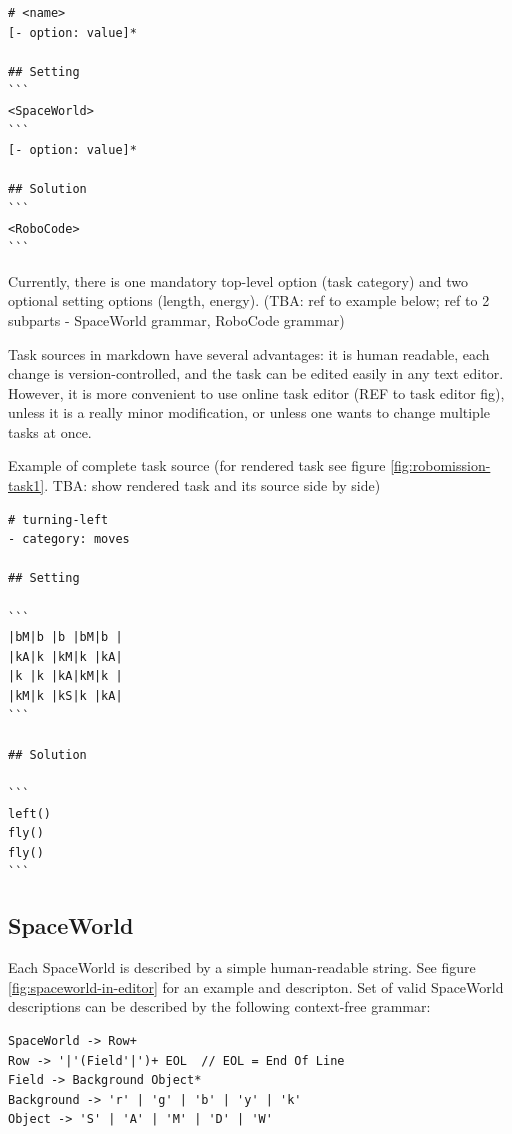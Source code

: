 \begin{lstlisting}
# <name>
[- option: value]*

## Setting
```
<SpaceWorld>
```
[- option: value]*

## Solution
```
<RoboCode>
```
\end{lstlisting}

Currently, there is one mandatory top-level option (task category)
and two optional setting options (length, energy).
(TBA: ref to example below; ref to 2 subparts - SpaceWorld grammar, RoboCode grammar)

Task sources in markdown have several advantages:
it is human readable,
each change is version-controlled,
and the task can be edited easily in any text editor.
However, it is more convenient to use online task editor (REF to task editor fig),
unless it is a really minor modification, or unless one wants to change multiple tasks at once.



Example of complete task source (for rendered task see figure \ref{fig:robomission-task1}. TBA: show rendered task and its source side by side)

\begin{lstlisting}
# turning-left
- category: moves

## Setting

```
|bM|b |b |bM|b |
|kA|k |kM|k |kA|
|k |k |kA|kM|k |
|kM|k |kS|k |kA|
```

## Solution

```
left()
fly()
fly()
```
\end{lstlisting}


\subsection{SpaceWorld}

Each SpaceWorld is described by a simple human-readable string.
See figure \ref{fig:spaceworld-in-editor} for an example and descripton.
Set of valid SpaceWorld descriptions can be described by the
following context-free grammar:

\begin{lstlisting}
SpaceWorld -> Row+
Row -> '|'(Field'|')+ EOL  // EOL = End Of Line
Field -> Background Object*
Background -> 'r' | 'g' | 'b' | 'y' | 'k'
Object -> 'S' | 'A' | 'M' | 'D' | 'W'
\end{lstlisting}


